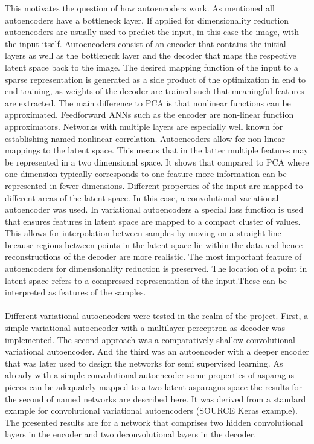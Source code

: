 This motivates the question of how autoencoders work. As mentioned all autoencoders have a bottleneck layer. If applied for dimensionality reduction autoencoders are usually used to predict the input, in this case the image, with the input itself. Autoencoders consist of an encoder that contains the initial layers as well as the bottleneck layer and the decoder that maps the respective latent space back to the image. The desired mapping function of the input to a sparse representation is generated as a side product of the optimization in end to end training, as weights of the decoder are trained such that meaningful features are extracted. The main difference to PCA is that nonlinear functions can be approximated. Feedforward ANNs such as the encoder are non-linear function approximators. Networks with multiple layers are especially well known for establishing named nonlinear correlation. Autoencoders allow for non-linear mappings to the latent space. This means that in the latter multiple features may be represented in a two dimensional space. It shows that compared to PCA where one dimension typically corresponds to one feature more information can be represented in fewer dimensions. Different properties of the input are mapped to different areas of the latent space. In this case, a convolutional variational autoencoder was used. In variational autoencoders a special loss function is used that ensures features in latent space are mapped to a compact cluster of values. This allows for interpolation between samples by moving on a straight line because regions between points in the latent space lie within the data and hence reconstructions of the decoder are more realistic. The most important feature of autoencoders for dimensionality reduction is preserved. The location of a point in latent space refers to a compressed representation of the input.These can be interpreted as features of the samples. \\
\\
Different variational autoencoders were tested in the realm of the project. First, a simple variational autoencoder with a multilayer perceptron as decoder was implemented. The second approach was  a comparatively shallow convolutional variational autoencoder. And the third was an autoencoder with a deeper encoder that was later used to design the networks for semi supervised learning. As already with a simple convolutional autoencoder some properties of asparagus pieces can be adequately mapped to a two latent asparagus space the results for the second of named networks are described here. It was derived from a standard example for convolutional variational autoencoders (SOURCE Keras example). The presented results are for a network that comprises two hidden convolutional layers in the encoder and two deconvolutional layers in the decoder. \\
